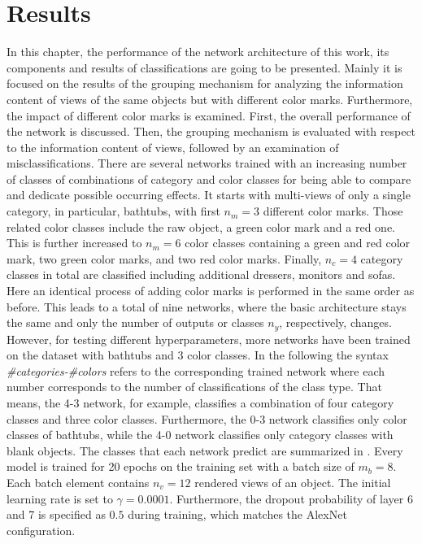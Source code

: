 \chapter{Results}
\label{sec:results}
In this chapter, the performance of the network architecture of this work, its components and results of classifications are going to be presented.
Mainly it is focused on the results of the grouping mechanism for analyzing the information content of views of the same objects but with different color marks.
Furthermore, the impact of different color marks is examined.
First, the overall performance of the network is discussed.
Then, the grouping mechanism is evaluated with respect to the information content of views, followed by an examination of misclassifications.
There are several networks trained with an increasing number of classes of combinations of category and color classes for being able to compare and dedicate possible occurring effects.
It starts with multi-views of only a single category, in particular, bathtubs, with first $n_m=3$ different color marks.
Those related color classes include the raw object, a green color mark and a red one.
This is further increased to $n_m = 6$ color classes containing a green and red color mark, two green color marks, and two red color marks.
Finally, $n_c = 4$ category classes in total are classified including additional dressers, monitors and sofas.
Here an identical process of adding color marks is performed in the same order as before.
This leads to a total of nine networks, where the basic architecture stays the same and only the number of outputs or classes $n_y$, respectively, changes.
However, for testing different hyperparameters, more networks have been trained on the dataset with bathtubs and 3 color classes.
In the following the syntax \emph{\#categories-\#colors} refers to the corresponding trained network where each number corresponds to the number of  classifications of the class type.
That means, the 4-3 network, for example, classifies a combination of four category classes and three color classes.
Furthermore, the 0-3 network classifies only color classes of bathtubs, while the 4-0 network classifies only category classes with blank objects.
The classes that each network predict are summarized in .
Every model is trained for 20 epochs on the training set with a batch size of $m_b=8$.
Each batch element contains $n_v=12$ rendered views of an object.
The initial learning rate is set to $\gamma=0.0001$.
Furthermore, the dropout probability of layer 6 and 7 is specified as $0.5$ during training, which matches the AlexNet configuration.
